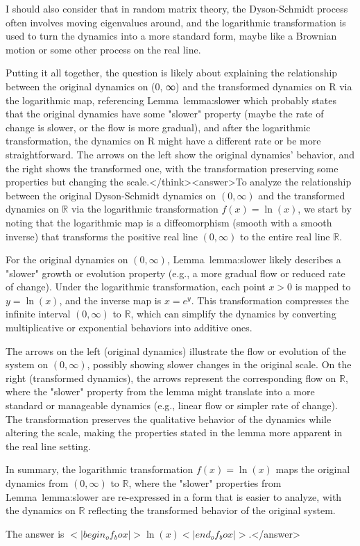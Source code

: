 I should also consider that in random matrix theory, the Dyson-Schmidt process often involves moving eigenvalues around, and the logarithmic transformation is used to turn the dynamics into a more standard form, maybe like a Brownian motion or some other process on the real line. 

Putting it all together, the question is likely about explaining the relationship between the original dynamics on (0, ∞) and the transformed dynamics on R via the logarithmic map, referencing Lemma~lemma:slower which probably states that the original dynamics have some "slower" property (maybe the rate of change is slower, or the flow is more gradual), and after the logarithmic transformation, the dynamics on R might have a different rate or be more straightforward. The arrows on the left show the original dynamics' behavior, and the right shows the transformed one, with the transformation preserving some properties but changing the scale.</think><answer>To analyze the relationship between the original Dyson-Schmidt dynamics on \((0, \infty)\) and the transformed dynamics on \(\mathbb{R}\) via the logarithmic transformation \(f(x) = \ln(x)\), we start by noting that the logarithmic map is a diffeomorphism (smooth with a smooth inverse) that transforms the positive real line \((0, \infty)\) to the entire real line \(\mathbb{R}\).  

For the original dynamics on \((0, \infty)\), Lemma~lemma:slower likely describes a "slower" growth or evolution property (e.g., a more gradual flow or reduced rate of change). Under the logarithmic transformation, each point \(x > 0\) is mapped to \(y = \ln(x)\), and the inverse map is \(x = e^y\). This transformation compresses the infinite interval \((0, \infty)\) to \(\mathbb{R}\), which can simplify the dynamics by converting multiplicative or exponential behaviors into additive ones.  

The arrows on the left (original dynamics) illustrate the flow or evolution of the system on \((0, \infty)\), possibly showing slower changes in the original scale. On the right (transformed dynamics), the arrows represent the corresponding flow on \(\mathbb{R}\), where the "slower" property from the lemma might translate into a more standard or manageable dynamics (e.g., linear flow or simpler rate of change). The transformation preserves the qualitative behavior of the dynamics while altering the scale, making the properties stated in the lemma more apparent in the real line setting.  

In summary, the logarithmic transformation \(f(x) = \ln(x)\) maps the original dynamics from \((0, \infty)\) to \(\mathbb{R}\), where the "slower" properties from Lemma~lemma:slower are re-expressed in a form that is easier to analyze, with the dynamics on \(\mathbb{R}\) reflecting the transformed behavior of the original system.  

The answer is \(<|begin_of_box|>\ln(x)<|end_of_box|>\).</answer>